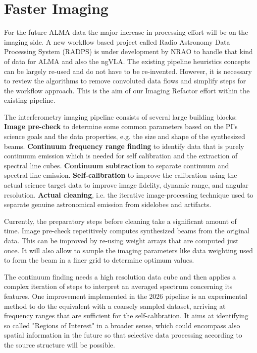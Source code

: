\documentclass[11pt,twoside]{article}
\begin{document}

\section{Faster Imaging}
For the future ALMA data the major increase in processing effort will
be on the imaging side. A new workflow based project called Radio
Astronomy Data Processing System (RADPS) is under development by NRAO to
handle that kind of data for ALMA and also the ngVLA. The existing
pipeline heuristics concepts can be largely re-used and do not have to be
re-invented. However, it is necessary to review the algorithms to remove
convoluted data flows and simplify steps for the workflow approach. This
is the aim of our Imaging Refactor effort within the existing pipeline.

The interferometry imaging pipeline consists of several large building
blocks:
{\bf Image pre-check} to determine some common parameters based on the PI's
science goals and the data properties, e.g. the size and shape of the
synthesized beams.
{\bf Continuum frequency range finding} to identify data that is purely
continuum emission which is needed for self calibration and the
extraction of spectral line cubes.
{\bf Continuum subtraction} to separate continuum and spectral line emission.
{\bf Self-calibration} to improve the calibration using the actual
science target data to improve image fidelity, dynamic range, and
angular resolution.
{\bf Actual cleaning}, i.e. the iterative image-processing technique used to
separate genuine astronomical emission from sidelobes and artifacts.

Currently, the preparatory steps before cleaning take a significant
amount of time. Image pre-check repetitively computes synthesized beams
from the original data. This can be improved by re-using weight arrays
that are computed just once. It will also allow to sample the imaging
parameters like data weighting used to form the beam in a finer grid to
determine optimum values.


The continuum finding needs a high resolution data cube and then applies
a complex iteration of steps to interpret an averaged spectrum concerning
its features. One improvement implemented in the 2026 pipeline is an
experimental method to do the equivalent with a coarsely sampled dataset,
arriving at frequency ranges that are sufficient for the self-calibration.
It aims at identifying so called "Regions of Interest" in a broader
sense, which could encompass also spatial information in the future so
that selective data processing according to the source structure will be
possible.
\end{document}
